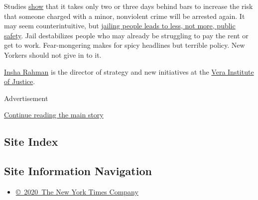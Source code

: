 Studies
\href{https://craftmediabucket.s3.amazonaws.com/uploads/PDFs/LJAF_Report_hidden-costs_FNL.pdf}{show}
that it takes only two or three days behind bars to increase the risk
that someone charged with a minor, nonviolent crime will be arrested
again. It may seem counterintuitive, but
\href{https://papers.ssrn.com/sol3/papers.cfm?abstract_id=3335138}{jailing
people leads to less, not more, public safety}. Jail destabilizes people
who may already be struggling to pay the rent or get to work.
Fear-mongering makes for spicy headlines but terrible policy. New
Yorkers should not give in to it.

\href{https://www.vera.org/people/insha-rahman}{Insha Rahman} is the
director of strategy and new initiatives at the
\href{https://www.vera.org/}{Vera Institute of Justice}.

Advertisement

\protect\hyperlink{after-bottom}{Continue reading the main story}

\hypertarget{site-index}{%
\subsection{Site Index}\label{site-index}}

\hypertarget{site-information-navigation}{%
\subsection{Site Information
Navigation}\label{site-information-navigation}}

\begin{itemize}
\tightlist
\item
  \href{https://help.nytimes3xbfgragh.onion/hc/en-us/articles/115014792127-Copyright-notice}{©~2020~The
  New York Times Company}
\end{itemize}

